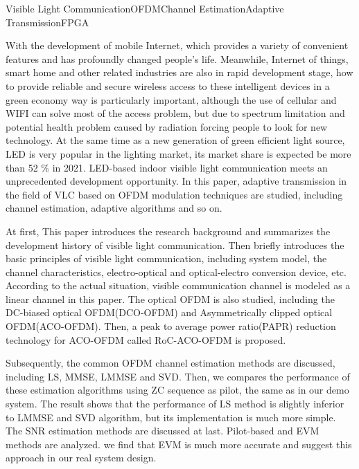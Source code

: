 
\begin{englishabstract}{Visible Light Communication\quad{}OFDM\quad{}Channel Estimation\quad{}Adaptive Transmission\quad{}FPGA}

With the development of mobile Internet, which provides a variety of convenient features and has profoundly changed people's life. Meanwhile, Internet of things, smart home and other related industries are also in rapid development stage, how to provide reliable and secure wireless access to these intelligent devices in a green economy way is particularly important, although the use of cellular and WIFI can solve most of the access problem, but due to spectrum limitation and potential health problem caused by radiation forcing people to look for new technology. At the same time as a new generation of green efficient light source, LED is very popular in the lighting market,  its market share is expected be more than 52 \% in 2021. LED-based indoor visible light communication meets an unprecedented development opportunity. In this paper, adaptive transmission in the field of VLC based on OFDM modulation techniques are studied, including channel estimation, adaptive algorithms and so on.

At first, This paper introduces the research background and summarizes the development history of visible light communication. Then briefly introduces the basic principles of visible light communication, including system model, the channel characteristics, electro-optical and optical-electro conversion device, etc. According to the actual situation, visible communication channel is modeled as a linear channel in this paper. The optical OFDM is also studied, including the DC-biased optical OFDM(DCO-OFDM) and Asymmetrically clipped optical OFDM(ACO-OFDM). Then, a peak to average power ratio(PAPR) reduction technology for ACO-OFDM called RoC-ACO-OFDM is proposed. 

Subsequently, the common OFDM channel estimation methods are discussed, including LS, MMSE, LMMSE and SVD. Then, we compares the performance of these estimation algorithms using ZC sequence as pilot,  the same as in our demo system. The result shows that the performance of LS method is slightly inferior to LMMSE and SVD algorithm, but its implementation is much more simple. The SNR estimation methods are discussed at last. Pilot-based and EVM methods are analyzed. we find that EVM is much more accurate and suggest this approach in our real system design.


\end{englishabstract}
